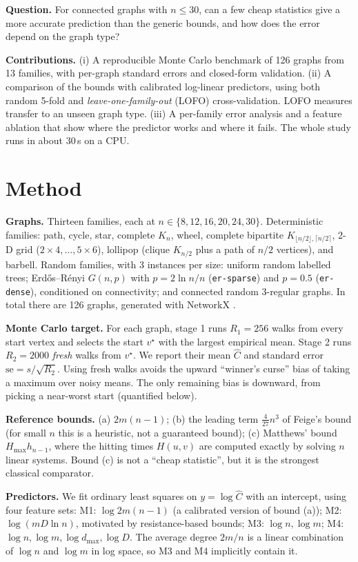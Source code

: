 \documentclass{article} %
\begin{document}
\textbf{Question.} For connected graphs with $n\le 30$, can a few cheap statistics give a more accurate prediction than the generic bounds, and how does the error depend on the graph type?

\textbf{Contributions.} (i) A reproducible Monte Carlo benchmark of 126 graphs from 13 families, with per-graph standard errors and closed-form validation. (ii) A comparison of the bounds with calibrated log-linear predictors, using both random 5-fold and \emph{leave-one-family-out} (LOFO) cross-validation. LOFO measures transfer to an unseen graph type. (iii) A per-family error analysis and a feature ablation that show where the predictor works and where it fails. The whole study runs in about 30\,s on a CPU.

\section{Method}
\textbf{Graphs.} Thirteen families, each at $n\in\{8,12,16,20,24,30\}$. Deterministic families: path, cycle, star, complete $K_n$, wheel, complete bipartite $K_{\lfloor n/2\rfloor,\lceil n/2\rceil}$, 2-D grid ($2{\times}4,\dots,5{\times}6$), lollipop (clique $K_{n/2}$ plus a path of $n/2$ vertices), and barbell. Random families, with 3 instances per size: uniform random labelled trees; Erd\H{o}s--R\'enyi $G(n,p)$ with $p=2\ln n/n$ (\texttt{er-sparse}) and $p=0.5$ (\texttt{er-dense}), conditioned on connectivity; and connected random 3-regular graphs. In total there are 126 graphs, generated with NetworkX \citep{networkx}.

\textbf{Monte Carlo target.} For each graph, stage 1 runs $R_1=256$ walks from every start vertex and selects the start $v^\star$ with the largest empirical mean. Stage 2 runs $R_2=2000$ \emph{fresh} walks from $v^\star$. We report their mean $\hat C$ and standard error $\mathrm{se}=s/\sqrt{R_2}$. Using fresh walks avoids the upward ``winner's curse'' bias of taking a maximum over noisy means. The only remaining bias is downward, from picking a near-worst start (quantified below).

\textbf{Reference bounds.} (a) $2m(n-1)$; (b) the leading term $\frac{4}{27}n^3$ of Feige's bound (for small $n$ this is a heuristic, not a guaranteed bound); (c) Matthews' bound $H_{\max}h_{n-1}$, where the hitting times $H(u,v)$ are computed exactly by solving $n$ linear systems. Bound (c) is not a ``cheap statistic'', but it is the strongest classical comparator.

\textbf{Predictors.} We fit ordinary least squares on $y=\log\hat C$ with an intercept, using four feature sets:
M1: $\log 2m(n{-}1)$ (a calibrated version of bound (a));
M2: $\log(mD\ln n)$, motivated by resistance-based bounds;
M3: $\log n,\log m$;
M4: $\log n,\log m,\log d_{\max},\log D$.
The average degree $2m/n$ is a linear combination of $\log n$ and $\log m$ in log space, so M3 and M4 implicitly contain it.
\end{document}
